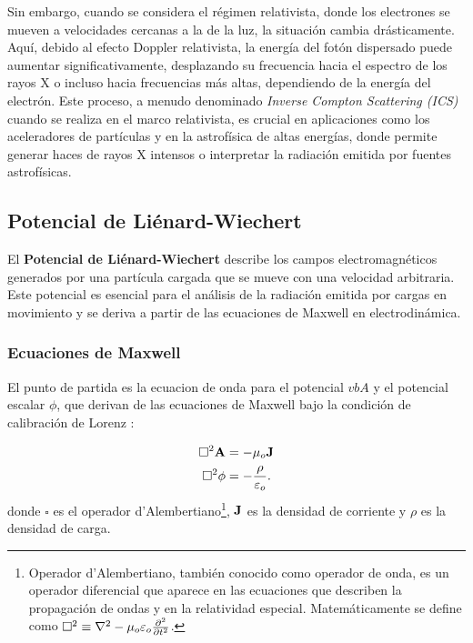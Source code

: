 Sin embargo, cuando se considera el régimen relativista, donde los electrones se mueven a velocidades cercanas a la de la luz, la situación cambia drásticamente. Aquí, debido al efecto Doppler relativista, la energía del fotón dispersado puede aumentar significativamente, desplazando su frecuencia hacia el espectro de los rayos X o incluso hacia frecuencias más altas, dependiendo de la energía del electrón. Este proceso, a menudo denominado \textit{Inverse Compton Scattering (ICS)} cuando se realiza en el marco relativista, es crucial en aplicaciones como los aceleradores de partículas y en la astrofísica de altas energías, donde permite generar haces de rayos X intensos o interpretar la radiación emitida por fuentes astrofísicas.



\subsection{Potencial de Liénard-Wiechert}
El \textbf{Potencial de Liénard-Wiechert} describe los campos electromagnéticos generados por una partícula cargada que se mueve con una velocidad arbitraria. Este potencial es esencial para el análisis de la radiación emitida por cargas en movimiento y se deriva a partir de las ecuaciones de Maxwell en electrodinámica.

\subsubsection{Ecuaciones de Maxwell}
El punto de partida es la ecuacion de onda para el potencial $vb{A}$ y el potencial escalar $\phi$, que derivan de las ecuaciones de Maxwell bajo la condición de calibración de Lorenz \cite{griffiths2021introduction}:

\begin{align}
    \square ^2 \vb{A} &= -\mu _o \vb{J} \label{vectorPotential} \\
    \square ^2 \phi &= -\frac{\rho}{\varepsilon _o}. \label{scalarPotential}
\end{align}
donde $\square$ es el operador d'Alembertiano\footnote{Operador d'Alembertiano, también conocido como operador de onda, es un operador diferencial que aparece en las ecuaciones que describen la propagación de ondas y en la relatividad especial. Matemáticamente se define como $\square ^2 \equiv \laplacian - \mu _o \varepsilon _o \pdv[2]{t}$.}, $\vb{J}$ es la densidad de corriente y $\rho$ es la densidad de carga.







%